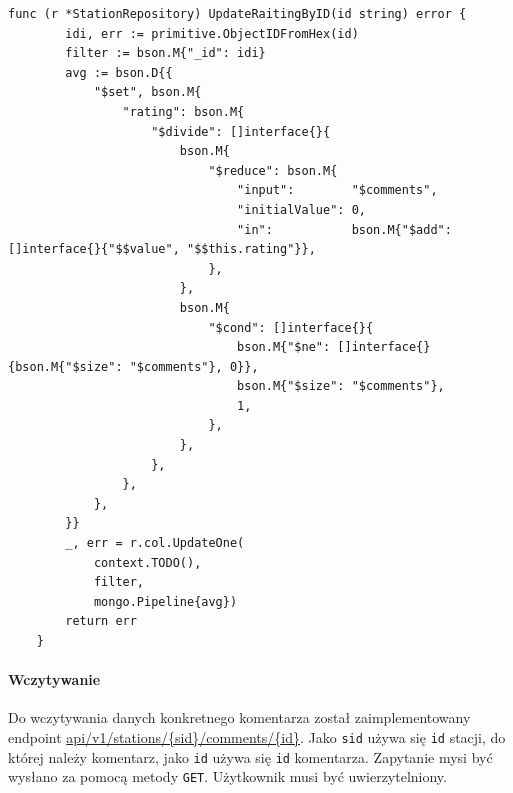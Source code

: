 

\begin{lstlisting}[label=list:update_rating,caption=Aktualizacja oceny stacji.,basicstyle=\tiny\ttfamily]
    func (r *StationRepository) UpdateRaitingByID(id string) error {
        idi, err := primitive.ObjectIDFromHex(id)
        filter := bson.M{"_id": idi}
        avg := bson.D{{
            "$set", bson.M{
                "rating": bson.M{
                    "$divide": []interface{}{
                        bson.M{
                            "$reduce": bson.M{
                                "input":        "$comments",
                                "initialValue": 0,
                                "in":           bson.M{"$add": []interface{}{"$$value", "$$this.rating"}},
                            },
                        },
                        bson.M{
                            "$cond": []interface{}{
                                bson.M{"$ne": []interface{}{bson.M{"$size": "$comments"}, 0}},
                                bson.M{"$size": "$comments"},
                                1,
                            },
                        },
                    },
                },
            },
        }}
        _, err = r.col.UpdateOne(
            context.TODO(),
            filter,
            mongo.Pipeline{avg})
        return err
    }
\end{lstlisting}

\paragraph{Wczytywanie\newline}
Do wczytywania danych konkretnego komentarza został zaimplementowany endpoint \url{api/v1/stations/{sid}/comments/{id}}. Jako \texttt{sid} używa się \texttt{id} stacji, do której należy komentarz, jako \texttt{id} używa się \texttt{id} komentarza.
Zapytanie mysi być wysłano za pomocą metody \texttt{GET}. Użytkownik musi być uwierzytelniony.

